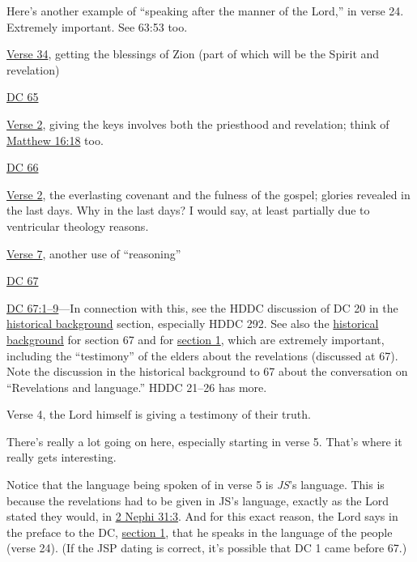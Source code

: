 \begin{compactdesc}
\begin{compactitem}
\begin{compactitem}
							\item Here's another example of ``speaking after the manner of the Lord,'' in verse 24. Extremely important. See 63:53 too.
						\end{compactitem}
					\item \hyperref[DC64-34]{Verse 34}, getting the blessings of Zion (part of which will be the Spirit and revelation)
				\end{compactitem}
			\item \hyperref[DC65]{DC 65}
				\begin{compactitem}
					\item \hyperref[DC65-2]{Verse 2}, giving the keys involves both the priesthood and revelation; think of \hyperref[MATTHEW-16-18]{Matthew 16:18} too.
				\end{compactitem}
			\item \hyperref[DC66]{DC 66}
				\begin{compactitem}
					\item \hyperref[DC66-2]{Verse 2}, the everlasting covenant and the fulness of the gospel; glories revealed in the last days. Why in the last days? I would say, at least partially due to ventricular theology reasons.
					\item \hyperref[DC66-7]{Verse 7}, another use of ``reasoning''
				\end{compactitem}
			\item \hyperref[DC67]{DC 67}
				\begin{compactitem}
					\item \hyperref[DC67-1]{DC 67:1--9}---In connection with this, see the HDDC discussion of DC 20 in the \hyperref[DC20-HB]{historical background} section, especially HDDC 292. See also the \hyperref[DC67-HB]{historical background} for section 67 and for \hyperref[DC1-HB]{section 1}, which are extremely important, including the ``testimony'' of the elders about the revelations (discussed at 67). Note the discussion in the historical background to 67 about the conversation on ``Revelations and language.'' HDDC 21--26 has more.
						\begin{compactitem}
							\item Verse 4, the Lord himself is giving a testimony of their truth.
							\item There's really a lot going on here, especially starting in verse 5. That's where it really gets interesting.
							\item Notice that the language being spoken of in verse 5 is \textit{JS}'s language. This is because the revelations had to be given in JS's language, exactly as the Lord stated they would, in \hyperref[2NEPHI-31-3]{2 Nephi 31:3}. And for this exact reason, the Lord says in the preface to the DC, \hyperref[DC1]{section 1}, that he speaks in the language of the people (verse 24). (If the JSP dating is correct, it's possible that DC 1 came before 67.)

\end{compactitem}
\end{compactitem}
\end{compactdesc}
